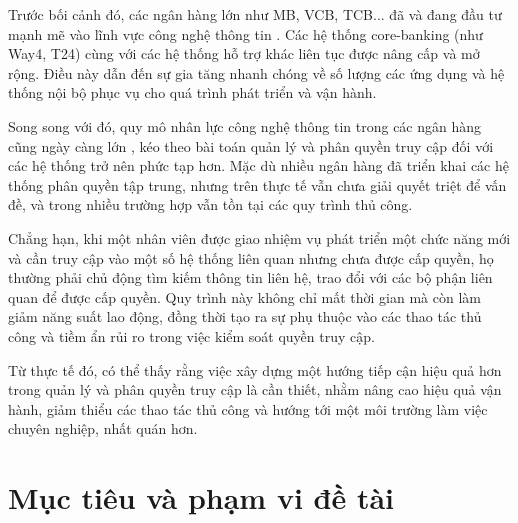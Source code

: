 \documentclass[../DoAn.tex]{subfiles}
\begin{document}
Trước bối cảnh đó, các ngân hàng lớn như MB, VCB, TCB... đã và đang đầu tư mạnh mẽ vào lĩnh vực công nghệ thông tin \cite{saigontimes_ngan_hang_cong_nghe}. Các hệ thống core-banking (như Way4, T24) cùng với các hệ thống hỗ trợ khác liên tục được nâng cấp và mở rộng. Điều này dẫn đến sự gia tăng nhanh chóng về số lượng các ứng dụng và hệ thống nội bộ phục vụ cho quá trình phát triển và vận hành.

Song song với đó, quy mô nhân lực công nghệ thông tin trong các ngân hàng cũng ngày càng lớn \cite{mb_nhan_luc_cntt}, kéo theo bài toán quản lý và phân quyền truy cập đối với các hệ thống trở nên phức tạp hơn. Mặc dù nhiều ngân hàng đã triển khai các hệ thống phân quyền tập trung, nhưng trên thực tế vẫn chưa giải quyết triệt để vấn đề, và trong nhiều trường hợp vẫn tồn tại các quy trình thủ công.

Chẳng hạn, khi một nhân viên được giao nhiệm vụ phát triển một chức năng mới và cần truy cập vào một số hệ thống liên quan nhưng chưa được cấp quyền, họ thường phải chủ động tìm kiếm thông tin liên hệ, trao đổi với các bộ phận liên quan để được cấp quyền. Quy trình này không chỉ mất thời gian mà còn làm giảm năng suất lao động, đồng thời tạo ra sự phụ thuộc vào các thao tác thủ công và tiềm ẩn rủi ro trong việc kiểm soát quyền truy cập.

Từ thực tế đó, có thể thấy rằng việc xây dựng một hướng tiếp cận hiệu quả hơn trong quản lý và phân quyền truy cập là cần thiết, nhằm nâng cao hiệu quả vận hành, giảm thiểu các thao tác thủ công và hướng tới một môi trường làm việc chuyên nghiệp, nhất quán hơn.

\section{Mục tiêu và phạm vi đề tài}
\label{section:1.2}


\end{document}
